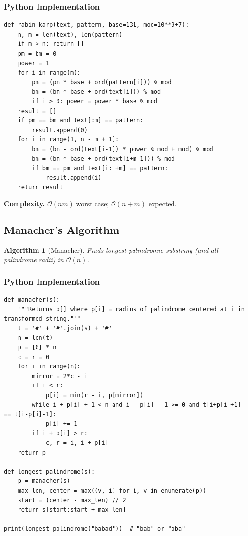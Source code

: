 \documentclass[10pt,a4paper]{article}
\theoremstyle{cpstyle}
\newtheorem{algorithm}[theorem]{Algorithm}
\newcommand{\bigO}[1]{\mathcal{O}\!\left(#1\right)}
\begin{document}
\subsubsection{Python Implementation}
\begin{lstlisting}[caption={Rabin-Karp rolling hash for pattern matching}]
def rabin_karp(text, pattern, base=131, mod=10**9+7):
    n, m = len(text), len(pattern)
    if m > n: return []
    pm = bm = 0
    power = 1
    for i in range(m):
        pm = (pm * base + ord(pattern[i])) % mod
        bm = (bm * base + ord(text[i])) % mod
        if i > 0: power = power * base % mod
    result = []
    if pm == bm and text[:m] == pattern:
        result.append(0)
    for i in range(1, n - m + 1):
        bm = (bm - ord(text[i-1]) * power % mod + mod) % mod
        bm = (bm * base + ord(text[i+m-1])) % mod
        if bm == pm and text[i:i+m] == pattern:
            result.append(i)
    return result
\end{lstlisting}

\textbf{Complexity.} $\bigO{nm}$ worst case; $\bigO{n+m}$ expected.

\subsection{Manacher's Algorithm}

\begin{algorithm}[Manacher]
Finds longest palindromic substring (and all palindrome radii) in $\bigO{n}$.
\end{algorithm}

\subsubsection{Python Implementation}
\begin{lstlisting}[caption={Manacher's Algorithm}]
def manacher(s):
    """Returns p[] where p[i] = radius of palindrome centered at i in transformed string."""
    t = '#' + '#'.join(s) + '#'
    n = len(t)
    p = [0] * n
    c = r = 0
    for i in range(n):
        mirror = 2*c - i
        if i < r:
            p[i] = min(r - i, p[mirror])
        while i + p[i] + 1 < n and i - p[i] - 1 >= 0 and t[i+p[i]+1] == t[i-p[i]-1]:
            p[i] += 1
        if i + p[i] > r:
            c, r = i, i + p[i]
    return p

def longest_palindrome(s):
    p = manacher(s)
    max_len, center = max((v, i) for i, v in enumerate(p))
    start = (center - max_len) // 2
    return s[start:start + max_len]

print(longest_palindrome("babad"))  # "bab" or "aba"
\end{lstlisting}
\end{document}
